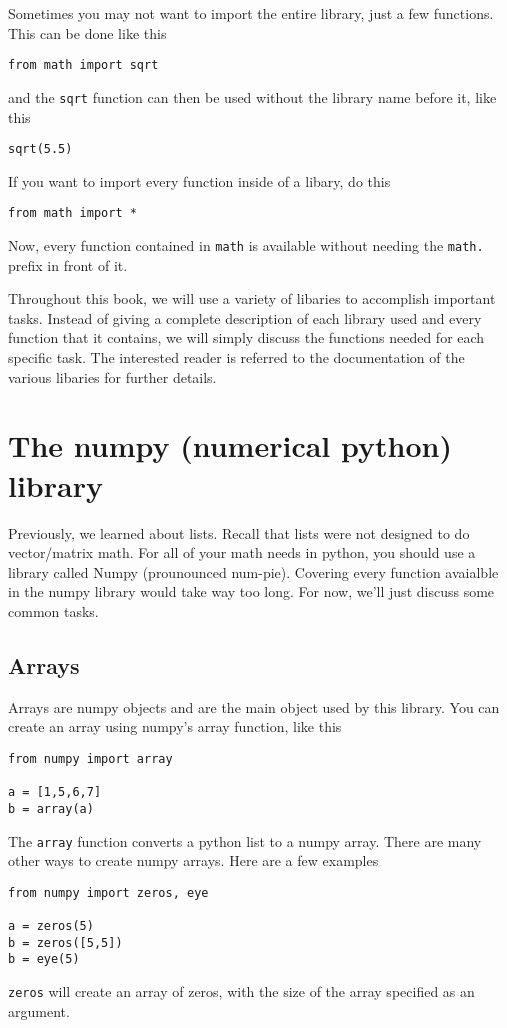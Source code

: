 Sometimes you may not want to import the entire library, just a few
functions. This can be done like this
\begin{Verbatim}
from math import sqrt
\end{Verbatim}
and the \texttt{sqrt} function can then be used without the library
name before it, like this
\begin{Verbatim}
sqrt(5.5)
\end{Verbatim}
If you want to import every function inside of a libary, do this
\begin{Verbatim}
from math import *
\end{Verbatim}
Now, every function contained in \texttt{math} is available without
needing the \texttt{math.} prefix in front of it.

Throughout this book, we will use a variety of libaries to accomplish
important tasks.  Instead of giving a complete description of each
library used and every function that it contains, we will simply
discuss the functions needed for each specific task.  The interested
reader is referred to the documentation of the various libaries for
further details.

\section{The numpy (numerical python) library}
Previously, we learned about lists.  Recall that lists were not
designed to do vector/matrix math.  For all of your math needs in
python, you should use a library called Numpy (prounounced num-pie).  Covering every function
avaialble in the numpy library would take way too long.  For now,
we'll just discuss some common tasks.

\subsection*{Arrays}
Arrays are numpy objects and are the main object used by this
library.  You can create an array using numpy's array function, like
this
\begin{Verbatim}
from numpy import array

a = [1,5,6,7]
b = array(a)     
\end{Verbatim}
The \texttt{array} function converts a python list to a numpy array.
There are many other ways to create numpy arrays.  Here are a few
examples
\begin{Verbatim}
from numpy import zeros, eye

a = zeros(5)
b = zeros([5,5])
b = eye(5)       
\end{Verbatim}

\texttt{zeros} will create an array of zeros, with the size of the
array specified as an argument.



